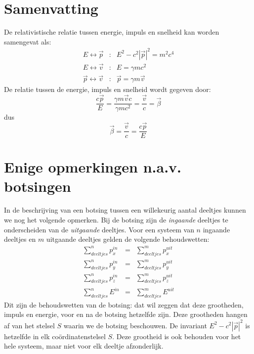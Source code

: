 \section{Samenvatting}
De relativistische relatie tussen energie, impuls en snelheid kan worden samengevat als:
\begin{eqnarray}
E\leftrightarrow \vec{p} & \mbox{:} & E^2 - c^2 |\vec{p}|^2 = m^2 c^4 \\ \nonumber
E\leftrightarrow \vec{v} & \mbox{:} & E = \gamma m c^2 \\ \nonumber
\vec{p} \leftrightarrow \vec{v} & \mbox{:} & \vec{p} = \gamma m \vec{v} 
\end{eqnarray}
De relatie tussen de energie, impuls en snelheid wordt gegeven door:
\begin{equation}
\frac{c\vec{p}}{E} = \frac{\gamma m \vec{v} c}{\gamma m c^2} = \frac{\vec{v}}{c} = \vec{\beta}
\end{equation}
dus 
\begin{equation}
\vec{\beta} = \frac{\vec{v}}{c} = \frac{c\vec{p}}{E}
\end{equation}

\section{Enige opmerkingen n.a.v. botsingen} 

In de beschrijving van een botsing tussen een willekeurig aantal
deeltjes kunnen we nog het volgende opmerken. Bij de botsing
zijn de {\it ingaande} deeltjes te onderscheiden van de {\it
uitgaande} deeltjes. Voor een systeem van $n$ ingaande deeltjes en
$m$ uitgaande deeltjes gelden de volgende behoudswetten:
\begin{eqnarray}
\sum_{deeltjes}^n p_x^{in} & = & \sum_{deeltjes}^m p_x^{uit} \\ \nonumber
\sum_{deeltjes}^n p_y^{in} & = & \sum_{deeltjes}^m p_y^{uit} \\ \nonumber
\sum_{deeltjes}^n p_z^{in} & = & \sum_{deeltjes}^m p_z^{uit} \\ \nonumber
\sum_{deeltjes}^n E^{in} & = & \sum_{deeltjes}^m E^{uit}
\end{eqnarray}
Dit zijn de behoudswetten van de botsing: dat wil zeggen dat deze grootheden, impuls en energie, 
voor en na de botsing hetzelfde zijn. Deze grootheden hangen af van het stelsel $S$ waarin we de botsing 
beschouwen. De invariant $E^2-c^2|\vec{p}|^2$ is hetzelfde in elk co\"ordinatenstelsel $S$. Deze grootheid is ook behouden voor het hele systeem, maar niet voor elk deeltje afzonderlijk.

